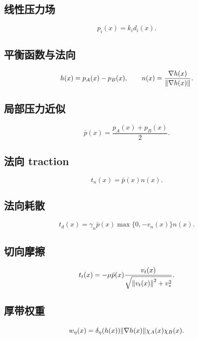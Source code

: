 \documentclass[12pt,a4paper]{ctexart}
\begin{document}
\subsection*{线性压力场}
\begin{equation}
    p_i(x)=k_i d_i(x).
\end{equation}

\subsection*{平衡函数与法向}
\begin{equation}
    h(x)=p_A(x)-p_B(x),
    \qquad
    n(x)=\frac{\nabla h(x)}{\norm{\nabla h(x)}}.
\end{equation}

\subsection*{局部压力近似}
\begin{equation}
    \bar p(x)=\frac{p_A(x)+p_B(x)}{2}.
\end{equation}

\subsection*{法向 traction}
\begin{equation}
    t_n(x)=\bar p(x)n(x).
\end{equation}

\subsection*{法向耗散}
\begin{equation}
    t_d(x)=\gamma_n\bar p(x)\max\{0,-v_n(x)\}n(x).
\end{equation}

\subsection*{切向摩擦}
\begin{equation}
    t_t(x)= -\mu\bar p(x)\frac{v_t(x)}{\sqrt{\norm{v_t(x)}^2+v_*^2}}.
\end{equation}

\subsection*{厚带权重}
\begin{equation}
    w_\eta(x)=\delta_\eta(h(x))\norm{\nabla h(x)}\chi_A(x)\chi_B(x).
\end{equation}
\end{document}
